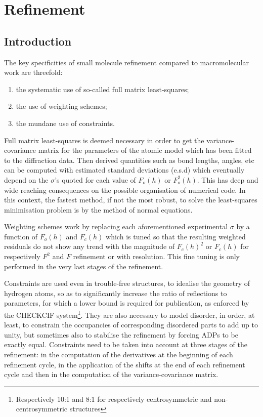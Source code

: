 \documentclass[12pt]{article}
\begin{document}
\section{Refinement}
\label{refinement}
\subsection{Introduction}

The key specificities of small molecule refinement compared to macromolecular work are threefold:
\begin{enumerate}
\item the systematic use of so-called full matrix least-squares;\label{fullmatrix}
\item the use of weighting schemes;\label{weightingschemes}
\item the mundane use of constraints.\label{constraints}
\end{enumerate}

Full matrix least-squares is deemed necessary in order to get the variance-covariance matrix for the parameters of the atomic model which has been fitted to the diffraction data. Then derived quantities such as bond lengths, angles, etc can be computed with estimated standard deviations (e.s.d) which eventually depend on the $\sigma$'s quoted for each value of $F_o(h)$ or $F_o^2(h)$. This has deep and wide reaching consequences on the possible organisation of numerical code. In this context, the fastest method, if not the most robust, to solve the least-squares minimisation problem is by the method of normal equations.

Weighting schemes work by replacing each aforementioned experimental $\sigma$ by a function of $F_o(h)$ and $F_c(h)$ which is tuned so that the resulting weighted residuals do not show any trend with the magnitude of $F_c(h)^2$ or $F_c(h)$ for respectively $F^2$ and $F$ refinement or with resolution. This fine tuning is only performed in the very last stages of the refinement.

Constraints are used even in trouble-free structures, to idealise the geometry of hydrogen atoms, so as to significantly increase the ratio of reflections to parameters, for which a lower bound is required for publication, as enforced by the CHECKCIF system\footnote{Respectively 10:1 and 8:1 for respectively centrosymmetric and non-centrosymmetric structures}. They are also necessary to model disorder, in order, at least, to constrain the occupancies of corresponding disordered parts to add up to unity, but sometimes also to stabilise the refinement by forcing ADPs to be exactly equal. Constraints need to be taken into account at three stages of the refinement: in the computation of the derivatives at the beginning of each refinement cycle, in the application of the shifts at the end of each refinement cycle and then in the computation of the variance-covariance matrix.
\end{document}
